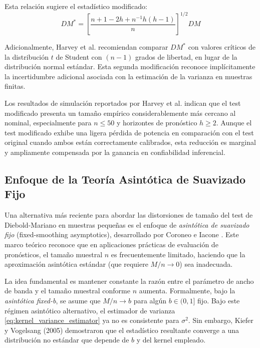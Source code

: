 Esta relación sugiere el estadístico modificado:
\begin{equation}
DM^* = \left[\frac{n+1-2h+n^{-1}h(h-1)}{n}\right]^{1/2} DM
\label{eq:dm_modified}
\end{equation}

Adicionalmente, Harvey et al. recomiendan comparar $DM^*$ con valores críticos de la distribución $t$ de Student con $(n-1)$ grados de libertad, en lugar de la distribución normal estándar. Esta segunda modificación reconoce implícitamente la incertidumbre adicional asociada con la estimación de la varianza en muestras finitas.

Los resultados de simulación reportados por Harvey et al. \parencite{Harvey1997} indican que el test modificado presenta un tamaño empírico considerablemente más cercano al nominal, especialmente para $n \leq 50$ y horizontes de pronóstico $h \geq 2$. Aunque el test modificado exhibe una ligera pérdida de potencia en comparación con el test original cuando ambos están correctamente calibrados, esta reducción es marginal y ampliamente compensada por la ganancia en confiabilidad inferencial.

\subsection{Enfoque de la Teoría Asintótica de Suavizado Fijo}

Una alternativa más reciente para abordar las distorsiones de tamaño del test de Diebold-Mariano en muestras pequeñas es el enfoque de \textit{asintótica de suavizado fijo} (fixed-smoothing asymptotics), desarrollado por Coroneo e Iacone \parencite{CoroneoIacone2020}. Este marco teórico reconoce que en aplicaciones prácticas de evaluación de pronósticos, el tamaño muestral $n$ es frecuentemente limitado, haciendo que la aproximación asintótica estándar (que requiere $M/n \to 0$) sea inadecuada.

La idea fundamental es mantener constante la razón entre el parámetro de ancho de banda y el tamaño muestral conforme $n$ aumenta. Formalmente, bajo la \textit{asintótica fixed-b}, se asume que $M/n \to b$ para algún $b \in (0,1]$ fijo. Bajo este régimen asintótico alternativo, el estimador de varianza \eqref{eq:kernel_variance_estimator} ya no es consistente para $\sigma^2$. Sin embargo, Kiefer y Vogelsang (2005) \parencite{kiefer2005} demostraron que el estadístico resultante converge a una distribución no estándar que depende de $b$ y del kernel empleado.

